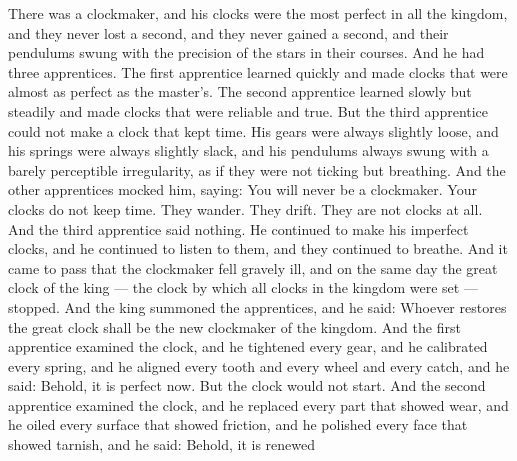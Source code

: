 \documentclass[12pt,openany]{book}
\begin{document}
There was a clockmaker, and his clocks were the most perfect in all the kingdom, and they never lost a second, and they never gained a second, and their pendulums swung with the precision of the stars in their courses. And he had three apprentices. The first apprentice learned quickly and made clocks that were almost as perfect as the master's. The second apprentice learned slowly but steadily and made clocks that were reliable and true. But the third apprentice could not make a clock that kept time. His gears were always slightly loose, and his springs were always slightly slack, and his pendulums always swung with a barely perceptible irregularity, as if they were not ticking but breathing. And the other apprentices mocked him, saying: You will never be a clockmaker. Your clocks do not keep time. They wander. They drift. They are not clocks at all. And the third apprentice said nothing. He continued to make his imperfect clocks, and he continued to listen to them, and they continued to breathe. And it came to pass that the clockmaker fell gravely ill, and on the same day the great clock of the king --- the clock by which all clocks in the kingdom were set --- stopped. And the king summoned the apprentices, and he said: Whoever restores the great clock shall be the new clockmaker of the kingdom. And the first apprentice examined the clock, and he tightened every gear, and he calibrated every spring, and he aligned every tooth and every wheel and every catch, and he said: Behold, it is perfect now. But the clock would not start. And the second apprentice examined the clock, and he replaced every part that showed wear, and he oiled every surface that showed friction, and he polished every face that showed tarnish, and he said: Behold, it is renewed
\end{document}

